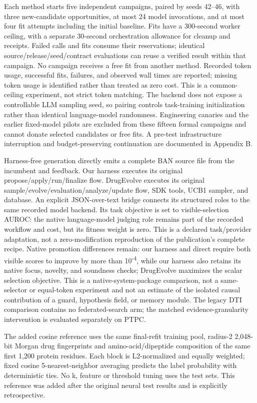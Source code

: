Each method starts five independent campaigns, paired by seeds 42--46, with three new-candidate opportunities, at most 24 model invocations, and at most four fit attempts including the initial baseline. Fits have a 300-second worker ceiling, with a separate 30-second orchestration allowance for cleanup and receipts. Failed calls and fits consume their reservations; identical source/release/seed/contract evaluations can reuse a verified result within that campaign. No campaign receives a free fit from another method. Recorded token usage, successful fits, failures, and observed wall times are reported; missing token usage is identified rather than treated as zero cost. This is a common-ceiling experiment, not strict token matching. The backend does not expose a controllable LLM sampling seed, so pairing controls task-training initialization rather than identical language-model randomness. Engineering canaries and the earlier fixed-model pilots are excluded from these fifteen formal campaigns and cannot donate selected candidates or free fits. A pre-test infrastructure interruption and budget-preserving continuation are documented in Appendix B.

Harness-free generation directly emits a complete BAN source file from the incumbent and feedback. Our harness executes its original propose/apply/run/finalize flow. DrugEvolve executes its original sample/evolve/evaluation/analyze/update flow, SDK tools, UCB1 sampler, and database. An explicit JSON-over-text bridge connects its structured roles to the same recorded model backend. Its task objective is set to visible-selection AUROC: the native language-model judging role remains part of the recorded workflow and cost, but its fitness weight is zero. This is a declared task/provider adaptation, not a zero-modification reproduction of the publication's complete recipe. Native promotion differences remain: our harness and direct require both visible scores to improve by more than 10\textsuperscript{-4}, while our harness also retains its native focus, novelty, and soundness checks; DrugEvolve maximizes the scalar selection objective. This is a native-system-package comparison, not a same-selector or equal-token experiment and not an estimate of the isolated causal contribution of a guard, hypothesis field, or memory module. The legacy DTI comparison contains no federated-search arm; the matched evidence-granularity intervention is evaluated separately on PTPC.

The added cosine reference uses the same final-refit training pool, radius-2 2,048-bit Morgan drug fingerprints and amino-acid/dipeptide composition of the same first 1,200 protein residues. Each block is L2-normalized and equally weighted; fixed cosine 5-nearest-neighbor averaging predicts the label probability with deterministic ties. No k, feature or threshold tuning uses the test sets. This reference was added after the original neural test results and is explicitly retrospective.

